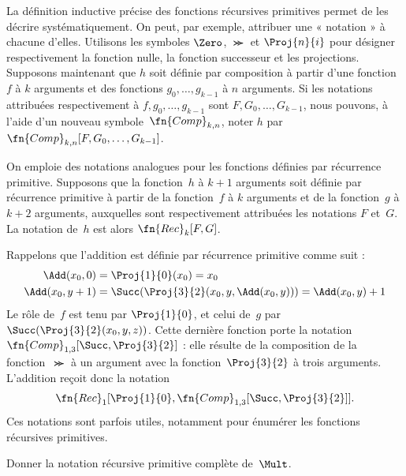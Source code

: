 \documentclass[../../../include/open-logic-section]{subfiles}
\begin{document}

La définition inductive précise des fonctions récursives primitives
permet de les décrire systématiquement. On peut, par exemple,
attribuer une « notation » à chacune d'elles. Utilisons les
symboles $\Zero$, $\Succ$ et $\Proj{n}{i}$ pour désigner
respectivement la fonction nulle, la fonction successeur et les
projections. Supposons maintenant que $h$ soit définie par
composition à partir d'une fonction~$f$ à $k$ arguments et des
fonctions $g_0,\dots,g_{k-1}$ à $n$ arguments. Si les notations
attribuées respectivement à $f,g_0,\dots,g_{k-1}$ sont
$F,G_0,\dots,G_{k-1}$, nous pouvons, à l'aide d'un nouveau
symbole~$\fn{Comp}_{k,n}$, noter $h$ par
$\fn{Comp}_{k,n}[F,G_0,\dots,G_{k-1}]$.

On emploie des notations analogues pour les fonctions définies
par récurrence primitive. Supposons que la fonction~$h$ à
$k+1$ arguments soit définie par récurrence primitive à partir
de la fonction~$f$ à $k$ arguments et de la fonction~$g$ à
$k+2$ arguments, auxquelles sont respectivement attribuées les
notations $F$ et~$G$. La notation de~$h$ est alors
$\fn{Rec}_k[F,G]$.

Rappelons que l'addition est définie par récurrence primitive
comme suit :
\begin{align*}
  \Add(x_0, 0) & = \Proj{1}{0}(x_0) = x_0\\
  \Add(x_0, y+1) & = \Succ(\Proj{3}{2}(x_0, y, \Add(x_0, y))) = \Add(x_0, y) +1
\end{align*}
Le rôle de~$f$ est tenu par $\Proj{1}{0}$, et celui de~$g$
par $\Succ(\Proj{3}{2}(x_0,y,z))$. Cette dernière fonction
porte la notation $\fn{Comp}_{1,3}[\Succ,\Proj{3}{2}]$ :
elle résulte de la composition de la fonction~$\Succ$ à un
argument avec la fonction~$\Proj{3}{2}$ à trois arguments.
L'addition reçoit donc la notation
\[
\fn{Rec}_1[\Proj{1}{0},\fn{Comp}_{1,3}[\Succ,\Proj{3}{2}]].
\]
Ces notations sont parfois utiles, notamment pour énumérer les
fonctions récursives primitives.

\begin{prob}
  Donner la notation récursive primitive complète de~$\Mult$.
\end{prob}
\end{document}
